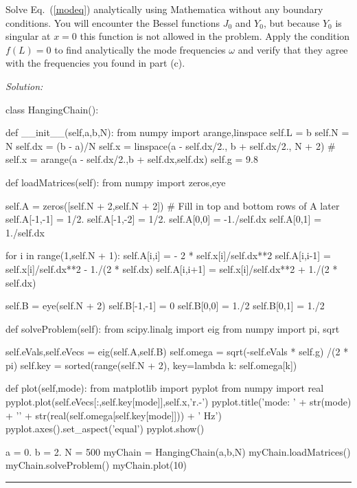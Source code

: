 \begin{enumerate}
\begin{enumerate}
\subprob Solve Eq.~(\ref{modeq}) analytically using
Mathematica without any boundary conditions. You will
encounter the Bessel functions $J_0$ and $Y_0$, but
because $Y_0$ is singular at $x=0$ this function is not
allowed in the problem. Apply the condition $f(L)=0$ to
find analytically the mode frequencies $\omega$ and
verify that they agree with the frequencies you found
in part (c).
\end{enumerate}
\end{enumerate}
\ifsolutions
\textit{Solution:}\\
\begin{codeexample}
\begin{VerbatimOut}{\listingFile}

class HangingChain():

    def __init__(self,a,b,N):
        from numpy import arange,linspace
        self.L = b
        self.N = N
        self.dx = (b - a)/N
        self.x = linspace(a - self.dx/2., b + self.dx/2., N + 2)
        #        self.x = arange(a - self.dx/2.,b + self.dx,self.dx)
        self.g = 9.8

    def loadMatrices(self):
        from numpy import zeros,eye
        
        self.A = zeros([self.N + 2,self.N + 2])
        # Fill in top and bottom rows of A later
        self.A[-1,-1] = 1/2.
        self.A[-1,-2] = 1/2.
        self.A[0,0] = -1./self.dx
        self.A[0,1] = 1./self.dx
        
        
        for i in range(1,self.N + 1):
            self.A[i,i] = - 2 * self.x[i]/self.dx**2
            self.A[i,i-1] = self.x[i]/self.dx**2 - 1./(2 * self.dx)
            self.A[i,i+1] =  self.x[i]/self.dx**2 + 1./(2 * self.dx)

        self.B = eye(self.N + 2)
        self.B[-1,-1] = 0
        self.B[0,0] = 1./2
        self.B[0,1] = 1./2
        

    def solveProblem(self):
        from scipy.linalg import eig
        from numpy import pi, sqrt
        
        self.eVals,self.eVecs = eig(self.A,self.B)
        self.omega = sqrt(-self.eVals * self.g) /(2 * pi)
        self.key = sorted(range(self.N + 2), key=lambda k: self.omega[k])


    def plot(self,mode):
        from matplotlib import pyplot
        from numpy import real
        pyplot.plot(self.eVecs[:,self.key[mode]],self.x,'r.-')
        pyplot.title('mode: ' + str(mode) + '\n' + str(real(self.omega[self.key[mode]])) + ' Hz')
        pyplot.axes().set_aspect('equal')
        pyplot.show()

a = 0.
b = 2.
N = 500
myChain = HangingChain(a,b,N)
myChain.loadMatrices()
myChain.solveProblem()
myChain.plot(10)


\end{VerbatimOut}
\end{codeexample}
\else
\noindent\rule{5 in}{0.01 in}
\fi


